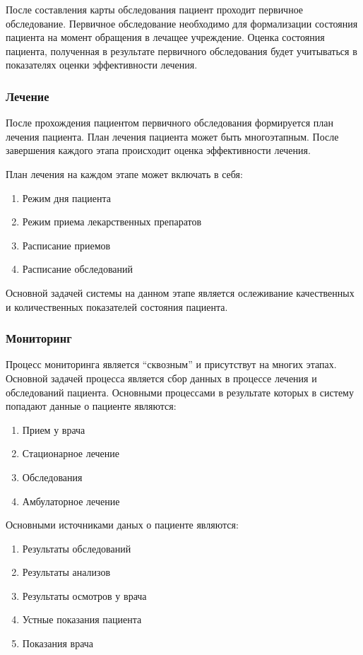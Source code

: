 После составления карты обследования пациент проходит первичное обследование.
Первичное обследование необходимо для формализации состояния пациента на момент
обращения в лечащее учреждение. Оценка состояния пациента, полученная в
результате первичного обследования будет учитываться в показателях оценки
эффективности лечения.

\subsubsection{Лечение}
После прохождения пациентом первичного обследования формируется план лечения
пациента. План лечения пациента может быть многоэтапным. После завершения
каждого этапа происходит оценка эффективности лечения.

План лечения на каждом этапе может включать в себя:

\begin{enumerate}
  \item Режим дня пациента
  \item Режим приема лекарственных препаратов
  \item Расписание приемов
  \item Расписание обследований    
\end{enumerate}

Основной задачей системы на данном этапе является ослеживание качественных и
количественных показателей состояния пациента.

\subsubsection{Мониторинг}
Процесс мониторинга является “сквозным” и присутствут на многих этапах. Основной
задачей процесса является сбор данных в процессе лечения и обследований
пациента.
Основными процессами в результате которых в систему попадают данные о пациенте
являются:

\begin{enumerate}
  \item Прием у врача
  \item Стационарное лечение
  \item Обследования
  \item Амбулаторное лечение 
\end{enumerate}

Основными источниками даных о пациенте являются:

\begin{enumerate}
  \item Результаты обследований
  \item Результаты анализов
  \item Результаты осмотров у врача
  \item Устные показания пациента
  \item Показания врача 
\end{enumerate}


